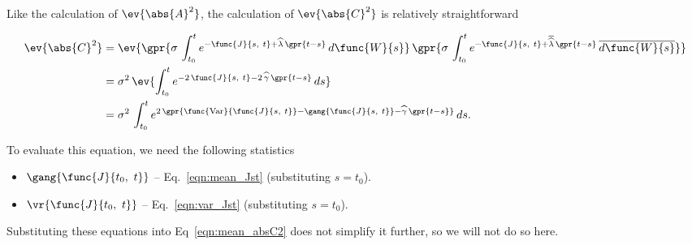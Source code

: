 Like the calculation of $\ev{\abs{A}^2}$, the calculation of $\ev{\abs{C}^2}$ is relatively straightforward

\begin{align}
    \ev{\abs{C}^2} &= \ev{\gpr{\sigma\,\int_{t_0}^{t} e^{-\func{J}{s,\ t} + \widehat{\lambda}\,\gpr{t - s}}\,d\func{W}{s}}\,\gpr{\sigma\,\int_{t_0}^{t} e^{-\func{J}{s,\ t} + \overline{\widehat{\lambda}}\,\gpr{t - s}}\,\overline{d\func{W}{s}}}} \nonumber \\
    	&= \sigma^2\,\ev{\int_{t_0}^{t} e^{-2\,\func{J}{s,\ t} - 2\,\widehat{\gamma}\,\gpr{t - s}}\,ds} \nonumber \\
    	&= \sigma^2\,\int_{t_0}^{t} e^{2\,\gpr{\func{\text{Var}}{\func{J}{s,\ t}} - \gang{\func{J}{s,\ t}} - \widehat{\gamma}\,\gpr{t - s}}}\,ds. \label{eqn:mean_absC2}
\end{align}

To evaluate this equation, we need the following statistics

\begin{itemize}
	\item [] $\gang{\func{J}{t_0,\ t}}$ -- Eq.~\ref{eqn:mean_Jst} (substituting $s = t_0$).
	\item [] $\vr{\func{J}{t_0,\ t}}$ -- Eq.~\ref{eqn:var_Jst} (substituting $s = t_0$).
\end{itemize}

Substituting these equations into Eq~\ref{eqn:mean_absC2} does not simplify it further, so we will not do so here.

